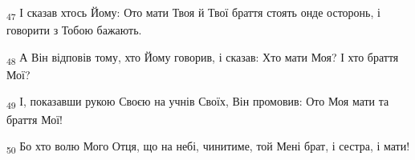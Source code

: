 \begin{tcolorbox}
\textsubscript{47} І сказав хтось Йому: Ото мати Твоя й Твої браття стоять онде осторонь, і говорити з Тобою бажають.
\end{tcolorbox}
\begin{tcolorbox}
\textsubscript{48} А Він відповів тому, хто Йому говорив, і сказав: Хто мати Моя? І хто браття Мої?
\end{tcolorbox}
\begin{tcolorbox}
\textsubscript{49} І, показавши рукою Своєю на учнів Своїх, Він промовив: Ото Моя мати та браття Мої!
\end{tcolorbox}
\begin{tcolorbox}
\textsubscript{50} Бо хто волю Мого Отця, що на небі, чинитиме, той Мені брат, і сестра, і мати!
\end{tcolorbox}
